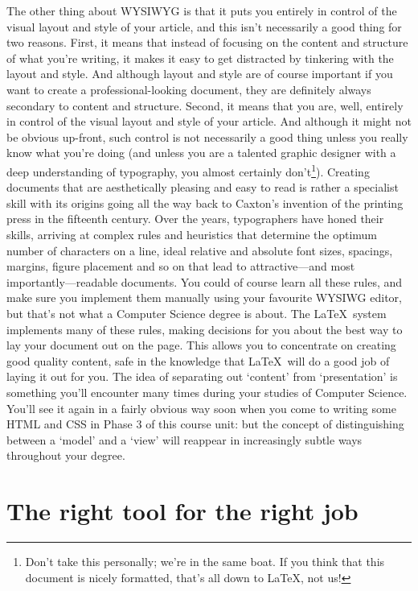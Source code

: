 \begin{refsection}
The other thing about WYSIWYG is that it puts you entirely in control of the visual layout and style of your article, and this isn't necessarily a good thing for two reasons. First, it means that instead of focusing on the content and structure of what you're writing, it makes it easy to get distracted by tinkering with the layout and style. And although layout and style are of course important if you want to create a professional-looking document, they are definitely always secondary to content and structure. Second, it means that you are, well, entirely in control of the visual layout and style of your article. And although it might not be obvious up-front, such control is not necessarily a good thing unless you really know what you're doing (and unless you are a talented graphic designer with a deep understanding of typography, you almost certainly don't\footnote{Don't take this personally; we're in the same boat. If you think that this document is nicely formatted, that's all down to \LaTeX, not us!}). Creating documents that are aesthetically pleasing and easy to read is rather a specialist skill with its origins going all the way back to Caxton's invention of the printing press in the fifteenth century.  Over the years, typographers have honed their skills, arriving at complex rules and heuristics that determine the optimum number of characters on a line, ideal relative and absolute font sizes, spacings, margins, figure placement and so on that lead to attractive---and most importantly---readable documents. You could of course learn all these rules, and make sure you implement them manually using your favourite WYSIWG editor, but that's not what a Computer Science degree is about. The \LaTeX\ system implements many of these rules, making decisions for you about the best way to lay your document out on the page. This allows you to concentrate on creating good quality content, safe in the knowledge that \LaTeX\ will do a good job of laying it out for you. The idea of separating out `content' from `presentation' is something you'll encounter many times during your studies of Computer Science. You'll see it again in a fairly obvious way soon when you come to writing some HTML and CSS in Phase 3 of this course unit: but the concept of distinguishing between a `model' and a `view' will reappear in increasingly subtle ways throughout your degree. 

\section{The right tool for the right job}


\end{refsection}
